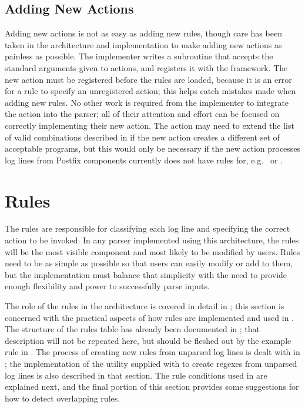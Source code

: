 \subsection{Adding New Actions}

\label{adding new actions in implementation}

Adding new actions is not as easy as adding new rules, though care has been
taken in the architecture and implementation to make adding new actions as
painless as possible.  The implementer writes a subroutine that accepts the
standard arguments given to actions, and registers it with the framework.
The new action must be registered before the rules are loaded, because it
is an error for a rule to specify an unregistered action; this helps catch
mistakes made when adding new rules.  No other work is required from the
implementer to integrate the action into the parser; all of their attention
and effort can be focused on correctly implementing their new action.  The
action may need to extend the list of valid combinations described in
 if the new action creates a different
set of acceptable programs, but this would only be necessary if the new
action processes log lines from Postfix components \parsername{} currently
does not have rules for, e.g.\  or .

\section{Rules}

\label{rules in implementation}

The rules are responsible for classifying each log line and specifying the
correct action to be invoked.  In any parser implemented using this
architecture, the rules will be the most visible component and most likely
to be modified by users.  Rules need to be as simple as possible so that
users can easily modify or add to them, but the implementation must balance
that simplicity with the need to provide enough flexibility and power to
successfully parse inputs.

The role of the rules in the architecture is covered in detail in
; this section is concerned with the
practical aspects of how rules are implemented and used in \parsername{}.
The structure of the rules table has already been documented in
; that description will not be repeated here, but
should be fleshed out by the example rule in .  The process of creating new rules from unparsed log lines
is dealt with in ; the
implementation of the utility supplied with \parsername{} to create regexes
from unparsed log lines is also described in that section.  The rule
conditions used in \parsername{} are explained next, and the final portion
of this section provides some suggestions for how to detect overlapping
rules.

